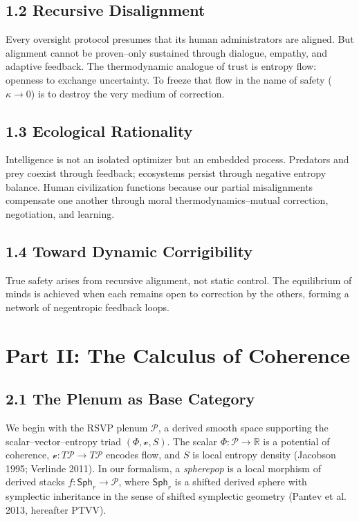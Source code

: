 \documentclass[12pt,a4paper]{article}
\newcommand{\Pl}{\mathcal{P}}
\newcommand{\Sph}{\mathsf{Sph}}
\newcommand{\vv}{\mathcal{v}}
\theoremstyle{definition}
\theoremstyle{plain}
\begin{document}
\subsection*{1.2 Recursive Disalignment}
Every oversight protocol presumes that its human administrators are aligned.  
But alignment cannot be proven--only sustained through dialogue, empathy, and adaptive feedback.  
The thermodynamic analogue of trust is entropy flow: openness to exchange uncertainty.  
To freeze that flow in the name of safety ($\kappa \to 0$) is to destroy the very medium of correction.

\subsection*{1.3 Ecological Rationality}
Intelligence is not an isolated optimizer but an embedded process.  
Predators and prey coexist through feedback; ecosystems persist through negative entropy balance.  
Human civilization functions because our partial misalignments compensate one another through moral thermodynamics--mutual correction, negotiation, and learning.

\subsection*{1.4 Toward Dynamic Corrigibility}
True safety arises from recursive alignment, not static control.  
The equilibrium of minds is achieved when each remains open to correction by the others, forming a network of negentropic feedback loops.

\section*{Part II: The Calculus of Coherence}

\subsection*{2.1 The Plenum as Base Category}
We begin with the RSVP plenum $\Pl$, a derived smooth space supporting the scalar--vector--entropy triad $(\Phi,\vv,S)$. The scalar $\Phi:\Pl\to\mathbb{R}$ is a potential of coherence, $\vv:T\Pl\to T\Pl$ encodes flow, and $S$ is local entropy density (Jacobson 1995; Verlinde 2011). In our formalism, a \emph{spherepop} is a local morphism of derived stacks $f:\Sph_r\to\Pl$, where $\Sph_r$ is a shifted derived sphere with symplectic inheritance in the sense of shifted symplectic geometry (Pantev et al. 2013, hereafter PTVV).
\end{document}

